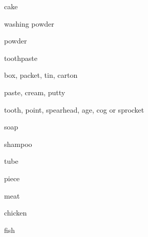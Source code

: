 \documentclass[avery5371,grid,frame]{flashcards}
\begin{document}
\begin{flashcard}{\LARGE cake}
\LARGE {}
\end{flashcard}
\begin{flashcard}{\LARGE washing powder}
\LARGE {}
\end{flashcard}
\begin{flashcard}{\LARGE powder}
\LARGE {}
\end{flashcard}
\begin{flashcard}{\LARGE toothpaste}
\LARGE {}
\end{flashcard}
\begin{flashcard}{\LARGE box, packet, tin, carton}
\LARGE {}
\end{flashcard}
\begin{flashcard}{\LARGE paste, cream, putty}
\LARGE {}
\end{flashcard}
\begin{flashcard}{\LARGE tooth, point, spearhead, age, cog or sprocket}
\LARGE {}
\end{flashcard}
\begin{flashcard}{\LARGE soap}
\LARGE {}
\end{flashcard}
\begin{flashcard}{\LARGE shampoo}
\LARGE {}
\end{flashcard}
\begin{flashcard}{\LARGE tube}
\LARGE {}
\end{flashcard}
\begin{flashcard}{\LARGE piece}
\LARGE {}
\end{flashcard}
\begin{flashcard}{\LARGE meat}
\LARGE {}
\end{flashcard}
\begin{flashcard}{\LARGE chicken}
\LARGE {}
\end{flashcard}
\begin{flashcard}{\LARGE fish}
\LARGE {}
\end{flashcard}
\end{document}
